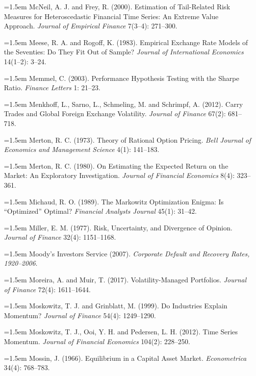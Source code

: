 \hangindent=1.5em McNeil, A. J. and Frey, R. (2000). Estimation of Tail-Related Risk Measures for Heteroscedastic Financial Time Series: An Extreme Value Approach. \emph{Journal of Empirical Finance} 7(3--4): 271--300.

\hangindent=1.5em Meese, R. A. and Rogoff, K. (1983). Empirical Exchange Rate Models of the Seventies: Do They Fit Out of Sample? \emph{Journal of International Economics} 14(1--2): 3--24.

\hangindent=1.5em Memmel, C. (2003). Performance Hypothesis Testing with the Sharpe Ratio. \emph{Finance Letters} 1: 21--23.

\hangindent=1.5em Menkhoff, L., Sarno, L., Schmeling, M. and Schrimpf, A. (2012). Carry Trades and Global Foreign Exchange Volatility. \emph{Journal of Finance} 67(2): 681--718.

\hangindent=1.5em Merton, R. C. (1973). Theory of Rational Option Pricing. \emph{Bell Journal of Economics and Management Science} 4(1): 141--183.

\hangindent=1.5em Merton, R. C. (1980). On Estimating the Expected Return on the Market: An Exploratory Investigation. \emph{Journal of Financial Economics} 8(4): 323--361.

\hangindent=1.5em Michaud, R. O. (1989). The Markowitz Optimization Enigma: Is ``Optimized'' Optimal? \emph{Financial Analysts Journal} 45(1): 31--42.

\hangindent=1.5em Miller, E. M. (1977). Risk, Uncertainty, and Divergence of Opinion. \emph{Journal of Finance} 32(4): 1151--1168.

\hangindent=1.5em Moody's Investors Service (2007). \emph{Corporate Default and Recovery Rates, 1920--2006}.

\hangindent=1.5em Moreira, A. and Muir, T. (2017). Volatility-Managed Portfolios. \emph{Journal of Finance} 72(4): 1611--1644.

\hangindent=1.5em Moskowitz, T. J. and Grinblatt, M. (1999). Do Industries Explain Momentum? \emph{Journal of Finance} 54(4): 1249--1290.

\hangindent=1.5em Moskowitz, T. J., Ooi, Y. H. and Pedersen, L. H. (2012). Time Series Momentum. \emph{Journal of Financial Economics} 104(2): 228--250.

\hangindent=1.5em Mossin, J. (1966). Equilibrium in a Capital Asset Market. \emph{Econometrica} 34(4): 768--783.

